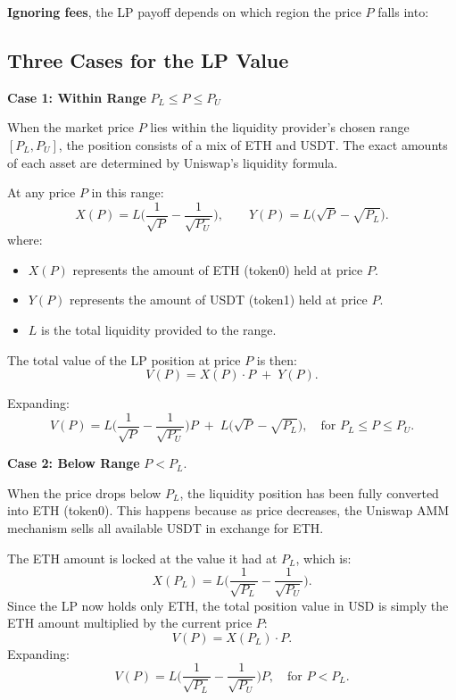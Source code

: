 \documentclass[12pt]{article}
\begin{document}
\begin{center}
\textbf{Ignoring fees}, the LP payoff depends on which region the price $P$ falls into:
\end{center}

\subsection{Three Cases for the LP Value}

\textbf{Case 1: Within Range} $P_L \le P \le P_U$ 

\medskip

When the market price $P$ lies within the liquidity provider's chosen range $[P_L, P_U]$, the position consists of a mix of ETH and USDT. The exact amounts of each asset are determined by Uniswap's liquidity formula.

\medskip

At any price $P$ in this range:
\[
X(P) = L \biggl(\frac{1}{\sqrt{P}} - \frac{1}{\sqrt{P_U}}\biggr),
\qquad
Y(P) = L \bigl(\sqrt{P} - \sqrt{P_L}\bigr).
\]
where:
\begin{itemize}
    \item $X(P)$ represents the amount of ETH (token0) held at price $P$.
    \item $Y(P)$ represents the amount of USDT (token1) held at price $P$.
    \item $L$ is the total liquidity provided to the range.
\end{itemize}

The total value of the LP position at price $P$ is then:
\[
V(P) = X(P) \cdot P \;+\; Y(P).
\]

Expanding:
\[
V(P) = L \biggl(\frac{1}{\sqrt{P}} - \frac{1}{\sqrt{P_U}}\biggr) P
\;+\;
L \bigl(\sqrt{P} - \sqrt{P_L}\bigr),
\quad \text{for } P_L \le P \le P_U.
\]

\medskip

\textbf{Case 2: Below Range} $P < P_L$.

\medskip

When the price drops below $P_L$, the liquidity position has been fully converted into ETH (token0). This happens because as price decreases, the Uniswap AMM mechanism sells all available USDT in exchange for ETH.

\medskip

The ETH amount is locked at the value it had at $P_L$, which is:
\[
X(P_L) = L \biggl(\frac{1}{\sqrt{P_L}} - \frac{1}{\sqrt{P_U}}\biggr).
\]
Since the LP now holds only ETH, the total position value in USD is simply the ETH amount multiplied by the current price $P$:
\[
V(P) = X(P_L) \cdot P.
\]
Expanding:
\[
V(P) = L \biggl(\frac{1}{\sqrt{P_L}} - \frac{1}{\sqrt{P_U}}\biggr) P,
\quad \text{for } P < P_L.
\]
\end{document}
